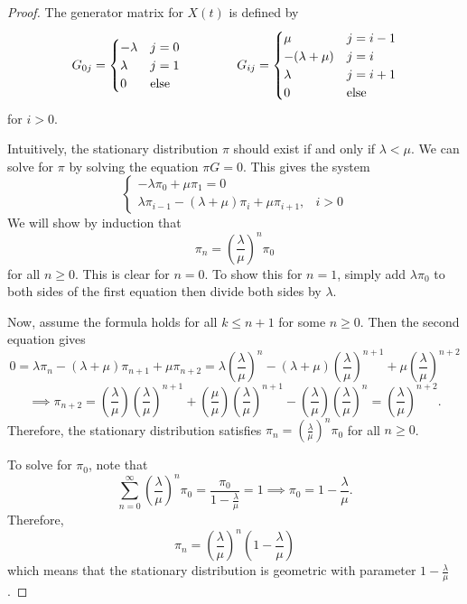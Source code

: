 \documentclass[12pt]{article}
\theoremstyle{definition}
\begin{document}
\begin{proof}
The generator matrix for $X(t)$ is defined by
$$
G_{0j} =
\begin{cases}
-\lambda & j = 0 \\
\lambda  & j = 1 \\
0 & \text{else}
\end{cases}
\hspace{1.5 cm}
G_{ij} = 
\begin{cases}
\mu & j = i-1 \\
-(\lambda + \mu) & j = i \\
\lambda & j = i+1 \\
0 & \text{else}
\end{cases}
$$
for $i > 0$.

Intuitively, the stationary distribution $\pi$ should exist if and only if $\lambda < \mu$.  We can solve for $\pi$ by solving the equation $\pi G = 0$.  This gives the system
$$
\begin{cases}
-\lambda \pi_0 + \mu \pi_1 = 0 \\
\lambda \pi_{i-1} - (\lambda + \mu) \pi_i + \mu \pi_{i+1}, & i > 0
\end{cases}
$$
We will show by induction that $$\pi_n = \left(\frac{\lambda}{\mu} \right)^n \pi_0$$ for all $n \geq 0$.  This is clear for $n=0$.  To show this for $n=1$, simply add $\lambda \pi_0$ to both sides of the first equation then divide both sides by $\lambda$.

Now, assume the formula holds for all $k \leq n+1$ for some $n \geq 0$.  Then the second equation gives
$$
0 = \lambda \pi_n - (\lambda + \mu)\pi_{n+1} + \mu \pi_{n+2} = \lambda \left(\frac{\lambda}{\mu}\right)^n - \left(\lambda + \mu\right) \left(\frac{\lambda}{\mu}\right)^{n+1} + \mu \left(\frac{\lambda}{\mu}\right)^{n+2}
$$
$$
\implies \pi_{n+2} = \left(\frac{\lambda}{\mu}\right)\left(\frac{\lambda}{\mu}\right)^{n+1} +\left(\frac{\mu}{\mu}\right) \left(\frac{\lambda}{\mu}\right)^{n+1} - \left(\frac{\lambda}{\mu}\right)\left(\frac{\lambda}{\mu}\right)^{n} = \left(\frac{\lambda}{\mu}\right)^{n+2}.
$$
Therefore, the stationary distribution satisfies $\pi_n = (\frac{\lambda}{\mu})^n \pi_0$ for all $n \geq 0$.

To solve for $\pi_0$, note that
$$
\sum\limits_{n=0}^\infty \left(\frac{\lambda}{\mu} \right)^n \pi_0 = \frac{\pi_0}{1-\frac{\lambda}{\mu}} = 1 \implies \pi_0 = 1 - \frac{\lambda}{\mu}.
$$
Therefore,
$$
\pi_n = \left(\frac{\lambda}{\mu} \right)^n \left(1 - \frac{\lambda}{\mu} \right)
$$
which means that the stationary distribution is geometric with parameter $1 - \frac{\lambda}{\mu}$.
\end{proof}
\end{document}
